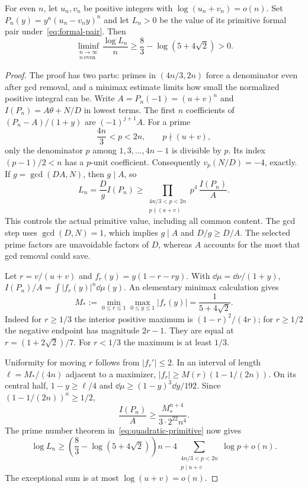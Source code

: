 \begin{theorem}\label{thm:quadratic}
For even $n$, let $u_n,v_n$ be positive integers with
$\log(u_n+v_n)=o(n)$. Set
$P_n(y)=y^n(u_n-v_ny)^n$ and let $L_n>0$ be the value of its
primitive formal pair under~\eqref{eq:formal-pair}. Then
\[
 \liminf_{\substack{n\to\infty\\n\ \text{even}}}
 \frac{\log L_n}{n}
 \geq\frac83-\log(5+4\sqrt2)>0.
\]
\end{theorem}
\begin{proof}
The proof has two parts: primes in $(4n/3,2n)$ force a denominator
even after gcd removal, and a minimax estimate limits how small the
normalized positive integral can be.
Write $A=P_n(-1)=(u+v)^n$ and $I(P_n)=A\theta+N/D$ in lowest
terms. The first $n$ coefficients of $(P_n-A)/(1+y)$ are
$(-1)^{j+1}A$. For a prime
\[
 \frac{4n}{3}<p<2n,\qquad p\nmid(u+v),
\]
only the denominator $p$ among $1,3,\ldots,4n-1$ is divisible by $p$.
Its index $(p-1)/2<n$ has a $p$-unit coefficient. Consequently
$v_p(N/D)=-4$, exactly. If $g=\gcd(DA,N)$, then $g\mid A$, so
\begin{equation}\label{eq:quadratic-primitive}
 L_n=\frac Dg I(P_n)
 \geq\prod_{\substack{4n/3<p<2n\\p\nmid(u+v)}}p^4\,
                  \frac{I(P_n)}A.
\end{equation}
This controls the actual primitive value, including all common content.
The gcd step uses $\gcd(D,N)=1$, which implies $g\mid A$ and
$D/g\geq D/A$. The selected prime factors are unavoidable factors
of $D$, whereas $A$ accounts for the most that gcd removal could save.

Let $r=v/(u+v)$ and $f_r(y)=y(1-r-ry)$. With
$\dd\mu=\dd\nu/(1+y)$,
$I(P_n)/A=\int|f_r(y)|^n\dd\mu(y)$. An elementary minimax calculation gives
\[
 M_*:=\min_{0\leq r\leq1}\max_{0\leq y\leq1}|f_r(y)|
       =\frac1{5+4\sqrt2}.
\]
Indeed for $r\geq1/3$ the interior positive maximum is
$(1-r)^2/(4r)$; for $r\geq1/2$ the negative endpoint has magnitude
$2r-1$. They are equal at $r=(1+2\sqrt2)/7$.
For $r<1/3$ the maximum is at least $1/3$.

Uniformity for moving $r$ follows from $|f_r'|\leq2$. In an interval
of length $\ell=M_*/(4n)$ adjacent to a maximizer,
$|f_r|\geq M(r)(1-1/(2n))$. On its central half,
$1-y\geq\ell/4$ and $\dd\mu\geq(1-y)^3\dd y/192$.
Since $(1-1/(2n))^n\geq1/2$,
\[
 \frac{I(P_n)}A\geq\frac{M_*^{n+4}}{3\cdot2^{22}n^4}.
\]
The prime number theorem in~\eqref{eq:quadratic-primitive} now gives
\[
 \log L_n\geq
 \left(\frac83-\log(5+4\sqrt2)\right)n
 -4\sum_{\substack{4n/3<p<2n\\p\mid u+v}}\log p+o(n).
\]
The exceptional sum is at most $\log(u+v)=o(n)$.
\end{proof}

